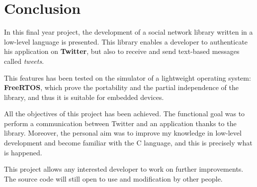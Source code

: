 \chapter{Conclusion}

\hspace{15mm}In this final year project, the development of a social network library written in a low-level language is presented. This library enables a developer to authenticate his application on \textbf{Twitter}, but also to receive and send text-based messages called \textit{tweets}.

This features has been tested on the simulator of a lightweight operating system: \textbf{FreeRTOS}, which prove the portability and the partial independence of the library, and thus it is suitable for embedded devices.

All the objectives of this project has been achieved. The functional goal was to perform a communication between Twitter and an application thanks to the library. Moreover, the personal aim was to improve my knowledge in low-level development and become familiar with the C language, and this is precisely what is happened.

This project allows any interested developer to work on further improvements. The source code will still open to use and modification by other people.


\clearpage